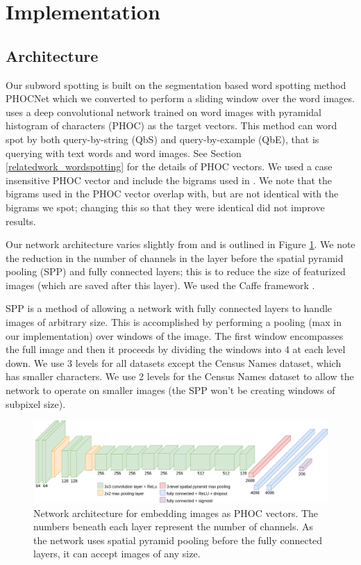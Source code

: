 \documentclass[ms,electronic,twosidetoc,letterpaper,chaptercenter,parttop,lol,lof,lot]{byumsphd}
\begin{document}
\section{Implementation}

\subsection{Architecture}

Our subword spotting is built on the segmentation based word spotting method PHOCNet \cite{sudholt2016} which we converted to perform a sliding window over the word images. \cite{sudholt2016} uses a deep convolutional network trained on word images with pyramidal histogram of characters (PHOC) \cite{Almazan2014} as the target vectors. This method can word spot by both query-by-string (QbS) and query-by-example (QbE), that is querying with text words and word images. See Section \ref{relatedwork_wordspotting} for the details of PHOC vectors. We used a case insensitive PHOC vector and include the bigrams used in \cite{sudholt2016}. We note that the bigrams used in the PHOC vector overlap with, but are not identical with the bigrams we spot; changing this so that they were identical did not improve results. 



Our network architecture varies slightly from \cite{sudholt2016} and is outlined in Figure \ref{fig:network}. We note the reduction in the number of channels in the layer before the spatial pyramid pooling (SPP) and fully connected layers; this is to reduce the size of featurized images (which are saved after this layer).  We used the Caffe framework \cite{caffe}.

SPP \cite{SPP} is a method of allowing a network with fully connected layers to handle images of arbitrary size. This is accomplished by performing a pooling (max in our implementation) over windows of the image. The first window encompasses the full image and then it proceeds by dividing the windows into 4 at each level down. We use 3 levels for all datasets except the Census Names dataset, which has smaller characters. We use 2 levels for the Census Names dataset to allow the network to operate on smaller images (the SPP won't be creating windows of subpixel size).


\begin{figure}[t]
    \centering
    \includegraphics[width=.98\textwidth]{thesis-phocnet}
    \caption{Network architecture for embedding images as PHOC vectors. The numbers beneath each layer represent the number of channels. As the network uses spatial pyramid pooling before the fully connected layers, it can accept images of any size.}
    \label{fig:network}
\end{figure}
\end{document}
